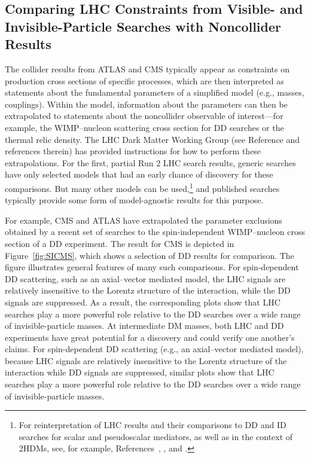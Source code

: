 \documentclass{ar-1col}
\begin{document}
{\subsection{Comparing LHC Constraints from Visible- and Invisible-Particle Searches with Noncollider Results}

The collider results from ATLAS and CMS typically appear as constraints
on production cross sections of specific processes, which are then
interpreted as statements about the fundamental parameters of a
simplified model (e.g., masses, couplings). Within the model,
information about the parameters can then be extrapolated to
statements about the noncollider observable of interest---for
example, the WIMP--nucleon scattering cross section for DD searches or the
thermal relic density. The LHC Dark
Matter Working Group (see Reference  and references therein) has provided instructions for how to
perform these extrapolations. For the first, partial Run 2 LHC search results, 
generic searches have only selected models that had an early chance of discovery 
for these comparisons. But many other
models can be used,\footnote{For reinterpretation of LHC results
and their comparisons to DD and ID searches for scalar and pseudoscalar
mediators, as well as in the context of 2HDMs, see, for example, References~, , and .} and
published searches typically provide some form of model-agnostic
results for this purpose.

For example, CMS and ATLAS have extrapolated the parameter exclusions
obtained by a recent set of searches to the spin-independent
WIMP--nucleon cross section of a DD experiment. The
result for CMS is depicted in Figure~\ref{fig:SICMS}, which shows a selection of DD results
for comparison. The figure illustrates general features of
many such comparisons. For spin-dependent DD scattering, such as an axial--vector mediated model, the LHC signals are relatively insensitive to the Lorentz structure of the interaction, while the DD signals are suppressed. As a result, the corresponding plots show that LHC searches play a more powerful role relative to the DD searches over a wide range of invisible-particle masses. At intermediate DM masses,
both LHC and DD experiments have great potential for a discovery
and could verify one another's claims. For spin-dependent DD
scattering (e.g., an axial--vector mediated model), because LHC
signals are relatively insensitive to the Lorentz structure of the
interaction while DD signals are suppressed, similar plots
show that LHC searches play a more powerful role relative to the
DD searches over a wide range of invisible-particle masses.

}
\end{document}
